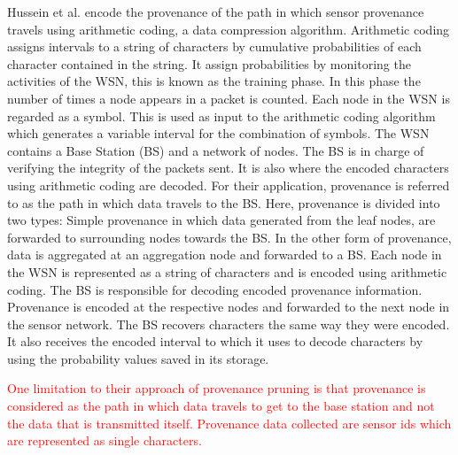Hussein et al. \cite{hussain_secure_2014} encode the provenance of the path in which  sensor provenance travels using arithmetic coding, a data compression algorithm. Arithmetic coding assigns intervals to a string of characters by  cumulative probabilities of each character contained in the string. It assign probabilities by monitoring the activities of the WSN, this is known as the training phase. In this phase the number of times a node appears in a packet is counted. Each node in the WSN is regarded as a symbol. This is used as input to the arithmetic coding algorithm which generates a variable interval for the combination of symbols. The WSN contains a Base Station (BS) and a network of nodes. The BS is in charge of verifying the integrity of the packets sent. It is also where the encoded characters using arithmetic coding are decoded.  For their application, provenance is referred to as the path in which data travels to the BS. Here, provenance is divided into two types: Simple provenance in which data generated from the leaf nodes, are forwarded to surrounding nodes towards the BS. In the other form of provenance, data is aggregated at an aggregation node and forwarded to a BS. Each node in the WSN is represented as a string of characters and is encoded using arithmetic coding. The BS is responsible for decoding encoded provenance information. Provenance is encoded at the respective nodes and forwarded to the next node in the sensor network. The BS recovers characters the same way they were encoded. It also receives the encoded interval to which it uses to decode characters by using the probability values saved in its storage.

\textcolor{red}{ One limitation to their approach of provenance pruning is that provenance is considered as the path in which data travels to get to the base station and not the data that is transmitted itself. Provenance data collected are sensor ids which are represented as single characters. }



















